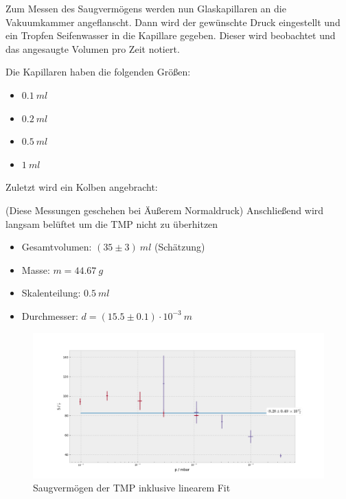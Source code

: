 \documentclass[12pt, a4paper]{scrartcl}
\begin{document}
    	
    	
    	
    	
        Zum Messen des Saugvermögens werden nun Glaskapillaren an die Vakuumkammer angeflanscht. Dann wird der gewünschte Druck eingestellt und ein Tropfen Seifenwasser in die Kapillare gegeben. Dieser wird beobachtet und das angesaugte Volumen pro Zeit notiert.
    	
    	Die Kapillaren haben die folgenden Größen:
        \begin{itemize}
            \item $0.1\ ml$
            \item $0.2\ ml$
            \item $0.5\ ml$
            \item $1\ ml$
        \end{itemize}
    	
    	
    	Zuletzt wird ein Kolben angebracht:
        
        
        (Diese Messungen geschehen bei Äußerem Normaldruck)
        Anschließend wird langsam belüftet um die TMP nicht zu überhitzen
    	
    	\begin{itemize}
    		\item Gesamtvolumen: $(35\pm3)\ ml$ (Schätzung)
    		\item Masse: $m=44.67\ g$
    		\item Skalenteilung: $0.5\ ml$
    		\item Durchmesser: $d=(15.5\pm0.1)\cdot10^{-3}\ m$
    	\end{itemize}
    	
    	
    	\begin{landscape}
            \begin{figure}[h!]
                \hspace*{-40mm}\includegraphics[width=1.8\textwidth]{../24-f1}
                \caption{Saugvermögen der TMP inklusive linearem Fit}
                \label{diagram:saugv}
            \end{figure}
            
        \end{landscape}
    
\end{document}

